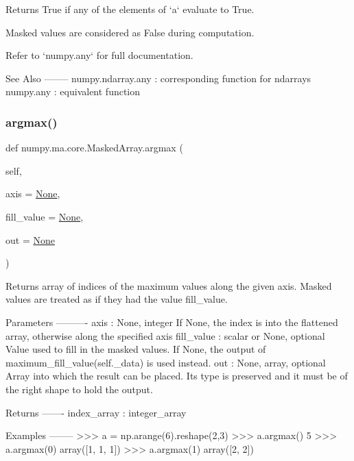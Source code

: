 \begin{DoxyVerb}Returns True if any of the elements of `a` evaluate to True.

Masked values are considered as False during computation.

Refer to `numpy.any` for full documentation.

See Also
--------
numpy.ndarray.any : corresponding function for ndarrays
numpy.any : equivalent function\end{DoxyVerb}
 \mbox{\label{classnumpy_1_1ma_1_1core_1_1MaskedArray_a3c3ec986dcc86a74638730ed8039a592}} 
\subsubsection{\texorpdfstring{argmax()}{argmax()}}
{\footnotesize\ttfamily def numpy.\+ma.\+core.\+Masked\+Array.\+argmax (\begin{DoxyParamCaption}\item[{}]{self,  }\item[{}]{axis = {\ttfamily \hyperlink{namespacenumpy_1_1ma_1_1core_a647ee1848dfa3692fe35a663a2aa40b3}{None}},  }\item[{}]{fill\+\_\+value = {\ttfamily \hyperlink{namespacenumpy_1_1ma_1_1core_a647ee1848dfa3692fe35a663a2aa40b3}{None}},  }\item[{}]{out = {\ttfamily \hyperlink{namespacenumpy_1_1ma_1_1core_a647ee1848dfa3692fe35a663a2aa40b3}{None}} }\end{DoxyParamCaption})}

\begin{DoxyVerb}Returns array of indices of the maximum values along the given axis.
Masked values are treated as if they had the value fill_value.

Parameters
----------
axis : {None, integer}
    If None, the index is into the flattened array, otherwise along
    the specified axis
fill_value : scalar or None, optional
    Value used to fill in the masked values.  If None, the output of
    maximum_fill_value(self._data) is used instead.
out : {None, array}, optional
    Array into which the result can be placed. Its type is preserved
    and it must be of the right shape to hold the output.

Returns
-------
index_array : {integer_array}

Examples
--------
>>> a = np.arange(6).reshape(2,3)
>>> a.argmax()
5
>>> a.argmax(0)
array([1, 1, 1])
>>> a.argmax(1)
array([2, 2])\end{DoxyVerb}
 \mbox{\label{classnumpy_1_1ma_1_1core_1_1MaskedArray_a7c24f2050287768a9a79a210de2aa9b1}} 
